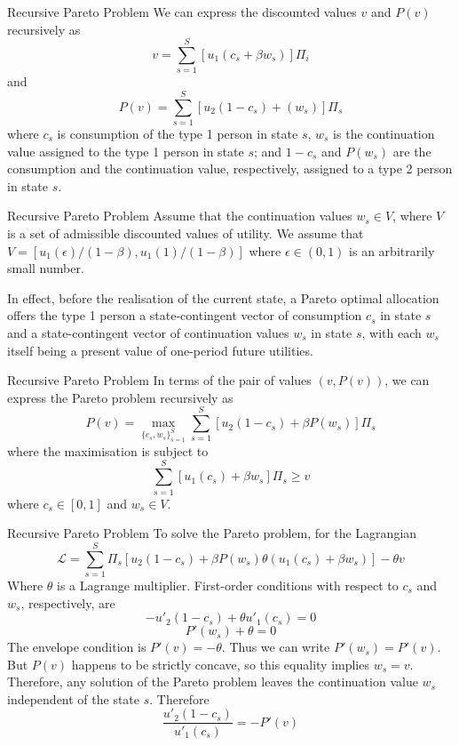 \documentclass[aspectratio=169,xcolor=dvipsnames]{beamer}
\begin{document}
\begin{frame}{Recursive Pareto Problem}
    We can express the discounted values $v$ and $P(v)$ recursively as
    \[
        v = \sum_{s=1}^S [u_1(c_s + \beta w_s)] \Pi_i
    \]
    and
    \[
        P(v) = \sum_{s=1}^S [u_2(1 - c_s) + (w_s)] \Pi_s
    \]
    where $c_s$ is consumption of the type 1 person in state $s$, $w_s$ is the continuation value assigned to the type 1 person in state $s$; and $1 - c_s$ and $P(w_s)$ are the consumption and the continuation value, respectively, assigned to a type 2 person in state $s$.
\end{frame}

\begin{frame}{Recursive Pareto Problem}
    Assume that the continuation values $w_s \in V$, where $V$ is a set of admissible discounted values of utility. We assume that $V = [u_1(\epsilon)/(1-\beta), u_1(1)/(1-\beta)]$ where $\epsilon \in (0,1)$ is an arbitrarily small number.

    In effect, before the realisation of the current state, a Pareto optimal allocation offers the type 1 person a state-contingent vector of consumption $c_s$ in state $s$ and a state-contingent vector of continuation values $w_s$ in state $s$, with each $w_s$ itself being a present value of one-period future utilities.
\end{frame}

\begin{frame}{Recursive Pareto Problem}
    In terms of the pair of values $(v, P(v))$, we can express the Pareto problem recursively as
    \[
        P(v) = \max_{\{c_s, w_s\}_{s=1}^S} \sum_{s=1}^S [u_2(1 - c_s) + \beta P(w_s)] \Pi_s
    \]
    where the maximisation is subject to
    \[
        \sum_{s=1}^S [u_1(c_s) + \beta w_s] \Pi_s \ge v
    \]
    where $c_s \in [0, 1]$ and $w_s \in V$.
\end{frame}

\begin{frame}{Recursive Pareto Problem}
    To solve the Pareto problem, for the Lagrangian
    \[
        \mathcal{L} = \sum_{s=1}^S \Pi_s [u_2(1 - c_s) + \beta P(w_s) \theta(u_1(c_s) + \beta w_s)] - \theta v
    \]
    Where $\theta$ is a Lagrange multiplier. First-order conditions with respect to $c_s$ and $w_s$, respectively, are
    \[
        -u'_2(1 - c_s) + \theta u'_1(c_s) = 0
    \]
    \[
        P'(w_s) + \theta = 0
    \]
    The envelope condition is $P'(v) = -\theta$. Thus we can write $P'(w_s) = P'(v)$. But $P(v)$ happens to be strictly concave, so this equality implies $w_s = v$. Therefore, any solution of the Pareto problem leaves the continuation value $w_s$ independent of the state $s$. Therefore
    \[
        \frac{u'_2(1 - c_s)}{u'_1(c_s)} = -P'(v)
    \]
\end{frame}
\end{document}
